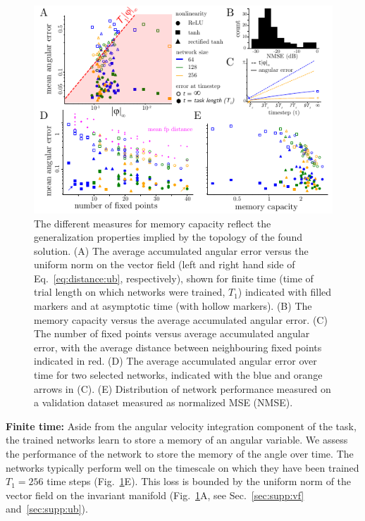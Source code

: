 \documentclass{article} %
\newcommand{\ptitle}[1]{\textbf{#1:}\xspace}
\newcounter{ct}
\theoremstyle{definition}
\theoremstyle{remark}
\begin{document}
\setlength\belowcaptionskip{-7ex}
\begin{figure}[tbhp]
  \centering
  \includegraphics[width=\textwidth]{angular_losses2}
  \caption{The different measures for memory capacity reflect the generalization properties implied by the topology of the found solution.
  (A) The average accumulated angular error versus the uniform norm on the vector field (left and right hand side of Eq.~\ref{eq:distance:ub}, respectively), shown for finite time (time of trial length on which networks were trained, \(T_1\)) indicated with filled markers and at asymptotic time (with hollow markers).
  (B) The memory capacity versus the average accumulated angular error.
  (C) The number of fixed points versus average accumulated angular error, with the average distance between neighbouring fixed points indicated in red.
  (D) The average accumulated angular error over time for two selected networks, indicated with the blue and orange arrows in (C).
  (E) Distribution of network performance measured on a validation dataset measured as normalized MSE (NMSE).
  }\label{fig:angular_loss}
\end{figure}
\setlength\belowcaptionskip{2ex}

\ptitle{Finite time}
Aside from the angular velocity integration component of the task, the trained networks learn to store a memory of an angular variable.
We assess the performance of the network to store the memory of the angle over time.
The networks typically perform well on the timescale on which they have been trained \(T_1=256\) time steps (Fig.~\ref{fig:angular_loss}E).
%
This loss is bounded by the uniform norm of the vector field on the invariant manifold (Fig.~\ref{fig:angular_loss}A,  see Sec.~\ref{sec:supp:vf} and~\ref{sec:supp:ub}).
\end{document}
